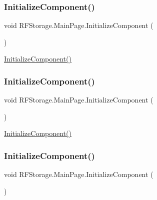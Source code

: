 \subsubsection{\texorpdfstring{InitializeComponent()}{InitializeComponent()}\hspace{0.1cm}{\footnotesize\ttfamily [1/8]}}
{\footnotesize\ttfamily void R\+F\+Storage.\+Main\+Page.\+Initialize\+Component (\begin{DoxyParamCaption}{ }\end{DoxyParamCaption})}



\mbox{\hyperlink{class_r_f_storage_1_1_main_page_a44b868cd44ff5ee9dbe953b104a1f9a1}{Initialize\+Component()}} 

\mbox{\label{class_r_f_storage_1_1_main_page_a44b868cd44ff5ee9dbe953b104a1f9a1}} 
\subsubsection{\texorpdfstring{InitializeComponent()}{InitializeComponent()}\hspace{0.1cm}{\footnotesize\ttfamily [2/8]}}
{\footnotesize\ttfamily void R\+F\+Storage.\+Main\+Page.\+Initialize\+Component (\begin{DoxyParamCaption}{ }\end{DoxyParamCaption})}



\mbox{\hyperlink{class_r_f_storage_1_1_main_page_a44b868cd44ff5ee9dbe953b104a1f9a1}{Initialize\+Component()}} 

\mbox{\label{class_r_f_storage_1_1_main_page_a44b868cd44ff5ee9dbe953b104a1f9a1}} 
\subsubsection{\texorpdfstring{InitializeComponent()}{InitializeComponent()}\hspace{0.1cm}{\footnotesize\ttfamily [3/8]}}
{\footnotesize\ttfamily void R\+F\+Storage.\+Main\+Page.\+Initialize\+Component (\begin{DoxyParamCaption}{ }\end{DoxyParamCaption})}



